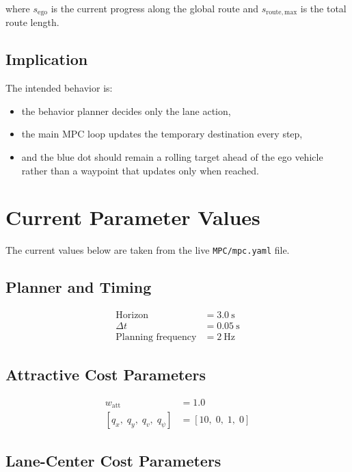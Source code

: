 \documentclass[11pt]{article}
\begin{document}
where $s_{\mathrm{ego}}$ is the current progress along the global route and
$s_{\mathrm{route,max}}$ is the total route length.

\subsection{Implication}

The intended behavior is:
\begin{itemize}
    \item the behavior planner decides only the lane action,
    \item the main MPC loop updates the temporary destination every step,
    \item and the blue dot should remain a rolling target ahead of the ego
    vehicle rather than a waypoint that updates only when reached.
\end{itemize}

\section{Current Parameter Values}

The current values below are taken from the live \texttt{MPC/mpc.yaml} file.

\subsection{Planner and Timing}

\begin{align}
\text{Horizon} &= 3.0~\mathrm{s} \\
\Delta t &= 0.05~\mathrm{s} \\
\text{Planning frequency} &= 2~\mathrm{Hz}
\end{align}

\subsection{Attractive Cost Parameters}

\begin{align}
w_{\mathrm{att}} &= 1.0 \\
[q_x,\; q_y,\; q_v,\; q_{\psi}] &= [10,\; 0,\; 1,\; 0]
\end{align}

\subsection{Lane-Center Cost Parameters}
\end{document}
